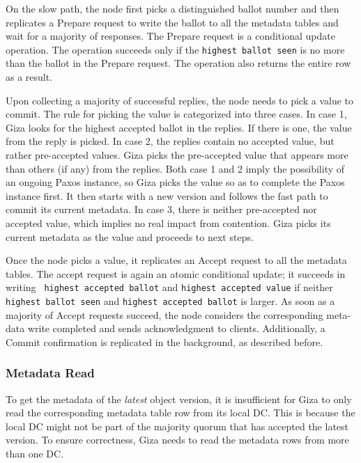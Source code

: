 On the slow path, the {\name} node first picks a distinguished ballot number
and then replicates a Prepare request to write the ballot to all the metadata
tables and wait for a majority of responses.
The Prepare request is a conditional update operation.
The operation succeeds only if the {\tt highest ballot seen} is no more than 
the ballot in the Prepare request.
The operation also returns the entire row as a result.

Upon collecting a majority of successful replies, the {\name} node needs to pick a value to commit.
The rule for picking the value is categorized into three cases.
In case 1, Giza looks for the highest accepted ballot in the replies.
If there is one, the value from the reply is picked.
In case 2, the replies contain no accepted value, but rather pre-accepted values.
Giza picks the pre-accepted value that appears more than others (if any) from the replies.
Both case 1 and 2 imply the possibility of an ongoing Paxos instance,
so Giza picks the value so as to complete the Paxos instance first.
It then starts with a new version and follows the fast path to commit its current metadata.
In case 3, there is neither pre-accepted nor accepted value,
which implies no real impact from contention.
Giza picks its current metadata as the value and proceeds to next steps.

Once the {\name} node picks a value, it replicates an Accept request to all the metadata tables.
The accept request is again an atomic conditional update; it succeeds in writing {\tt
highest accepted ballot} and {\tt highest accepted value} if neither {\tt
highest ballot seen} and {\tt highest accepted ballot} is larger.
As soon as a majority of Accept requests succeed, the \name node considers the
corresponding meta-data write completed and sends acknowledgment to clients.
Additionally, a Commit confirmation is replicated in the background, as described before.

\subsubsection{Metadata Read}

To get the metadata of the \emph{latest} object version,
it is insufficient for Giza to only read the corresponding metadata table row from its local DC.
This is because the local DC might not be part of the majority quorum that has accepted the latest version.
To ensure correctness, Giza needs to read the metadata rows from more than one DC.

